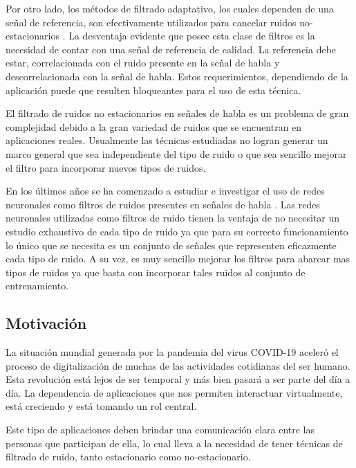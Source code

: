 Por otro lado, los métodos de filtrado adaptativo, los cuales dependen de una señal de referencia, son efectivamente utilizados para cancelar ruidos no-estacionarios \cite{a_family_of_adaptive_filter_slgorithms_in_noise_cancellation_for_speech_enhancement}. La desventaja evidente que posee esta clase de filtros es la necesidad de contar con una señal de referencia de calidad. La referencia debe estar, correlacionada con el ruido presente en la señal de habla y descorrelacionada con la señal de habla. Estos requerimientos, dependiendo de la aplicación puede que resulten bloqueantes para el uso de esta técnica.

El filtrado de ruidos no estacionarios en señales de habla es un problema de gran complejidad debido a la gran variedad de ruidos que se encuentran en aplicaciones reales. Usualmente las técnicas estudiadas no logran generar un marco general que sea independiente del tipo de ruido o que sea sencillo mejorar el filtro para incorporar nuevos tipos de ruidos.

En los últimos años se ha comenzado a estudiar e investigar el uso de redes neuronales como filtros de ruidos presentes en señales de habla \cite{a_regression_approach_to_speech_enhancement_based_on_deep_neural_networks,speech_enhancement_in_multiple_moise_conditions_using_deep_neural_networks,a_convolutional_recurrent_neural_network_for_real_time_speech_enhancement}. Las redes neuronales utilizadas como filtros de ruido tienen la ventaja de no necesitar un estudio exhaustivo de cada tipo de ruido ya que para su correcto funcionamiento lo único que se necesita es un conjunto de señales que representen eficazmente cada tipo de ruido. A su vez, es muy sencillo mejorar los filtros para abarcar mas tipos de ruidos ya que basta con incorporar tales ruidos al conjunto de entrenamiento.

\subsection{Motivación}

La situación mundial generada por la pandemia del virus COVID-19 aceleró el proceso de digitalización de muchas de las actividades cotidianas del ser humano. Esta revolución está lejos de ser temporal y más bien pasará a ser parte del día a día. La dependencia de aplicaciones que nos permiten interactuar virtualmente, está creciendo y está tomando un rol central.

Este tipo de aplicaciones deben brindar una comunicación clara entre las personas que participan de ella, lo cual lleva a la necesidad de tener técnicas de filtrado de ruido, tanto estacionario como no-estacionario.

